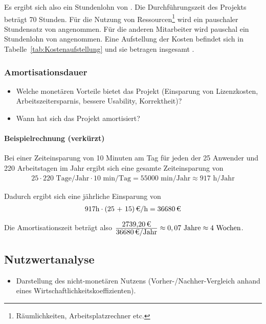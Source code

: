 Es ergibt sich also ein Stundenlohn von . 
Die Durchführungszeit des Projekts beträgt 70 Stunden. Für die Nutzung von Ressourcen\footnote{Räumlichkeiten, Arbeitsplatzrechner etc.} wird 
ein pauschaler Stundensatz von  angenommen. Für die anderen Mitarbeiter wird pauschal ein Stundenlohn von  angenommen. 
Eine Aufstellung der Kosten befindet sich in Tabelle~\ref{tab:Kostenaufstellung} und sie betragen insgesamt .


\subsubsection{Amortisationsdauer}
\label{sec:Amortisationsdauer}
\begin{itemize}
	\item Welche monetären Vorteile bietet das Projekt (\zB Einsparung von Lizenzkosten, Arbeitszeitersparnis, bessere Usability, Korrektheit)?
	\item Wann hat sich das Projekt amortisiert?
\end{itemize}

\paragraph{Beispielrechnung (verkürzt)}
Bei einer Zeiteinsparung von 10 Minuten am Tag für jeden der 25 Anwender und 220 Arbeitstagen im Jahr ergibt sich eine gesamte Zeiteinsparung von 
\begin{eqnarray}
25 \cdot 220 \mbox{ Tage/Jahr} \cdot 10 \mbox{ min/Tag} = 55000 \mbox{ min/Jahr} \approx 917 \mbox{ h/Jahr} 
\end{eqnarray}

Dadurch ergibt sich eine jährliche Einsparung von 
\begin{eqnarray}
917 \mbox{h} \cdot \eur{(25 + 15)}{\mbox{/h}} = \eur{36680}
\end{eqnarray}

Die Amortisationszeit beträgt also $\frac{\eur{2739,20}}{\eur{36680}\mbox{/Jahr}} \approx 0,07 \mbox{ Jahre} \approx 4 \mbox{ Wochen}$.


\subsection{Nutzwertanalyse}
\label{sec:Nutzwertanalyse}
\begin{itemize}
	\item Darstellung des nicht-monetären Nutzens (\zB Vorher-/Nachher-Vergleich anhand eines Wirtschaftlichkeitskoeffizienten). 
\end{itemize}

